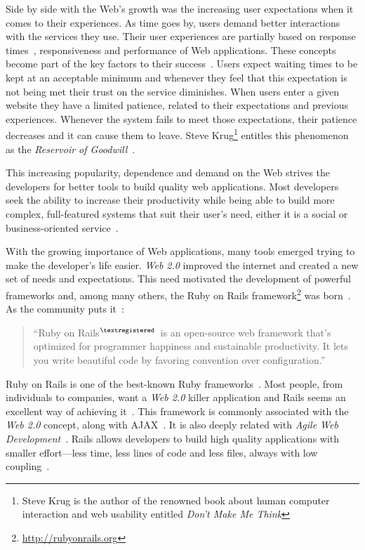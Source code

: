 Side by side with the Web's growth was the increasing user expectations when it comes to their experiences. As time goes by, users demand better interactions with the services they use. Their user experiences are partially based on response times~\cite{prioritizing_web_usability}, responsiveness and performance of Web applications. These concepts become part of the key factors to their success~\cite{responsiveness}. Users expect waiting times to be kept at an acceptable minimum and whenever they feel that this expectation is not being met their trust on the service diminishes. When users enter a given website they have a limited patience, related to their expectations and previous experiences. Whenever the system fails to meet those expectations, their patience decreases and it can cause them to leave. Steve Krug\footnote{Steve Krug is the author of the renowned book about human computer interaction and web usability entitled \textit{Don't Make Me Think}} entitles this phenomenon as the \textit{Reservoir of Goodwill}~\cite{dont_make_me_think}.

This increasing popularity, dependence and demand on the Web strives the developers for better tools to build quality web applications. Most developers seek the ability to increase their productivity while being able to build more complex, full-featured systems that suit their user's need, either it is a social or business-oriented service~\cite{comparison_agile_frameworks}.

With the growing importance of Web applications, many tools emerged trying to make the developer's life easier. \textit{Web 2.0} improved the internet and created a new set of needs and expectations. This need motivated the development of powerful frameworks and, among many others, the Ruby on Rails framework\footnote{\url{http://rubyonrails.org}} was born~\cite{what_is_web20}. As the community puts it~\cite{rubyonrails}:
\begin{quote}
  ``Ruby on Rails$^{\scriptsize \textregistered}$~is an open-source web framework that's optimized for programmer happiness and sustainable productivity. It lets you write beautiful code by favoring convention over configuration.''
\end{quote}
Ruby on Rails is one of the best-known Ruby frameworks~\cite{agile_webdevelopment_with_rails}. Most people, from individuals to companies, want a \textit{Web 2.0} killer application and Rails seems an excellent way of achieving it~\cite{oo_business_models}. This framework is commonly associated with the \textit{Web 2.0} concept, along with AJAX~\cite{spaghetti_code}. It is also deeply related with \textit{Agile Web Development}~\cite{agile_webdevelopment_with_rails}. Rails allows developers to build high quality applications with smaller effort---less time, less lines of code and less files, always with low coupling~\cite{maintainability_web_applications_j2ee_dotnet_ror}.

